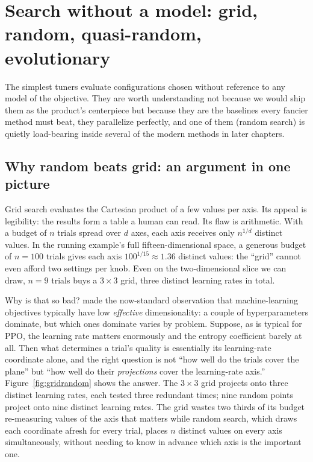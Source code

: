 \chapter{Search without a model: grid, random, quasi-random, evolutionary}
\label{sec:modelfree}

The simplest tuners evaluate configurations chosen without reference to any
model of the objective. They are worth understanding not because we would
ship them as the product's centerpiece but because they are the baselines
every fancier method must beat, they parallelize perfectly, and one of them
(random search) is quietly load-bearing inside several of the modern methods
in later chapters.

\section{Why random beats grid: an argument in one picture}

Grid search evaluates the Cartesian product of a few values per axis. Its
appeal is legibility: the results form a table a human can read. Its flaw is
arithmetic. With a budget of $n$ trials spread over $d$ axes, each axis
receives only $n^{1/d}$ distinct values. In the running example's full
fifteen-dimensional space, a generous budget of $n = 100$ trials gives each
axis $100^{1/15} \approx 1.36$ distinct values: the ``grid'' cannot even
afford two settings per knob. Even on the two-dimensional slice we can draw,
$n = 9$ trials buys a $3 \times 3$ grid, three distinct learning rates in
total.

Why is that so bad? \citet{bergstra2012random} made the now-standard
observation that machine-learning objectives typically have low
\emph{effective} dimensionality: a couple of hyperparameters dominate, but
which ones dominate varies by problem. Suppose, as is typical for PPO, the
learning rate matters enormously and the entropy coefficient barely at all.
Then what determines a trial's quality is essentially its learning-rate
coordinate alone, and the right question is not ``how well do the trials
cover the plane'' but ``how well do their \emph{projections} cover the
learning-rate axis.'' Figure~\ref{fig:gridrandom} shows the answer. The
$3 \times 3$ grid projects onto three distinct learning rates, each tested
three redundant times; nine random points project onto nine distinct
learning rates. The grid wastes two thirds of its budget re-measuring values
of the axis that matters while random search, which draws each coordinate
afresh for every trial, places $n$ distinct values on every axis
simultaneously, without needing to know in advance which axis is the
important one.

